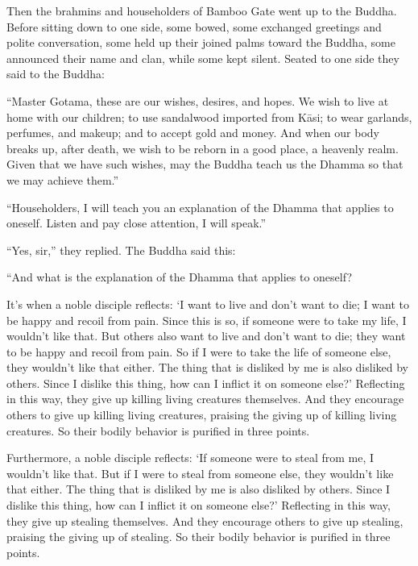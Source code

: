 \documentclass[12pt,openany]{book}%
\begin{document}
Then the brahmins and householders of Bamboo Gate went up to the Buddha. Before sitting down to one side, some bowed, some exchanged greetings and polite conversation, some held up their joined palms toward the Buddha, some announced their name and clan, while some kept silent. Seated to one side they said to the Buddha: 

“Master Gotama, these are our wishes, desires, and hopes. We wish to live at home with our children; to use sandalwood imported from \textsanskrit{Kāsi}; to wear garlands, perfumes, and makeup; and to accept gold and money. And when our body breaks up, after death, we wish to be reborn in a good place, a heavenly realm. Given that we have such wishes, may the Buddha teach us the Dhamma so that we may achieve them.” 

“Householders, I will teach you an explanation of the Dhamma that applies to oneself. Listen and pay close attention, I will speak.” 

“Yes, sir,” they replied. The Buddha said this: 

“And what is the explanation of the Dhamma that applies to oneself? 

It’s when a noble disciple reflects: ‘I want to live and don’t want to die; I want to be happy and recoil from pain. Since this is so, if someone were to take my life, I wouldn’t like that. But others also want to live and don’t want to die; they want to be happy and recoil from pain. So if I were to take the life of someone else, they wouldn’t like that either. The thing that is disliked by me is also disliked by others. Since I dislike this thing, how can I inflict it on someone else?’ Reflecting in this way, they give up killing living creatures themselves. And they encourage others to give up killing living creatures, praising the giving up of killing living creatures. So their bodily behavior is purified in three points. 

Furthermore, a noble disciple reflects: ‘If someone were to steal from me, I wouldn’t like that. But if I were to steal from someone else, they wouldn’t like that either. The thing that is disliked by me is also disliked by others. Since I dislike this thing, how can I inflict it on someone else?’ Reflecting in this way, they give up stealing themselves. And they encourage others to give up stealing, praising the giving up of stealing. So their bodily behavior is purified in three points. 
\end{document}
